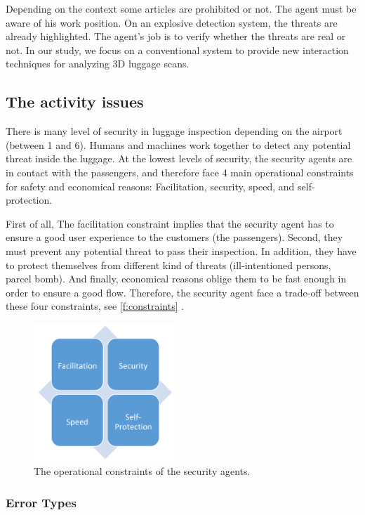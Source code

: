 Depending on the context some articles are prohibited or not. The agent must be aware of his work position.
On an explosive detection system, the threats are already highlighted. The agent's job is to verify whether the threats are real or not.
In our study, we focus on a conventional system to provide new interaction techniques for analyzing 3D luggage scans.

\subsection{The activity issues}
There is many level of security in luggage inspection depending on the airport (between 1 and 6). Humans and machines work together to detect any potential threat inside the luggage. At the lowest levels of security, the security agents are in contact with the passengers, and therefore face 4 main operational constraints for safety and economical reasons: Facilitation, security, speed, and self-protection. 

First of all, The facilitation constraint implies that the security agent has to ensure a good user experience to the customers (the passengers). Second, they must prevent any potential threat to pass their inspection. In addition, they have to protect themselves from different kind of threats (ill-intentioned persons, parcel bomb). And finally, economical reasons oblige them to be fast enough in order to ensure a good flow. Therefore, the security agent face a trade-off between these four constraints, see  \autoref{f:constraints} .
\begin{figure}
\centering
	\includegraphics[height=5.2cm]{Figures/constraints}
	\caption{The operational constraints of the security agents.}
	\label{f:constraints}
\end{figure}



\subsubsection{ Error Types }


